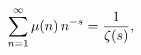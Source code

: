 \[\sum_{n=1}^{\infty}\mathop{\mu\/}\nolimits\!\left(n\right)n^{-s}=\frac{1}{%
\mathop{\zeta\/}\nolimits\!\left(s\right)},\]